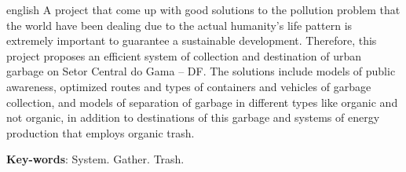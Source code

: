 \begin{resumo}[Abstract]
 \begin{otherlanguage*}{english}
   A project that come up with good solutions to the pollution problem that the world have been dealing due to the actual humanity’s life pattern is extremely important to guarantee a sustainable development. Therefore, this project proposes an efficient system of collection and destination of urban garbage on Setor Central do Gama – DF. The solutions include models of public awareness, optimized routes and types of containers and vehicles of garbage collection, and models of separation of garbage in different types like organic and not organic, in addition to destinations of this garbage and systems of energy production that employs organic trash.

   \vspace{\onelineskip}

   \noindent
   \textbf{Key-words}: System. Gather. Trash.
 \end{otherlanguage*}
\end{resumo}
